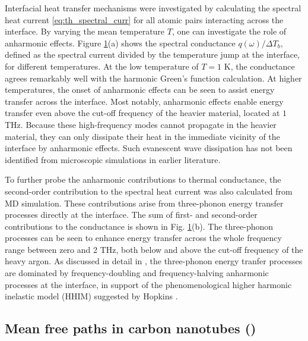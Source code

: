 \begin{figure}[tb]
\begin{center}
 \label{fig:nemd_fig2}
 \end{center}
\end{figure}

Interfacial heat transfer mechanisms were investigated by calculating the spectral heat current \eqref{eq:th_spectral_curr} for all atomic pairs interacting across the interface. By varying the mean temperature $T$, one can investigate the role of anharmonic effects. Figure \ref{fig:nemd_fig2}(a) shows the spectral conductance $q(\omega)/\Delta T_b$, defined as the spectral current divided by the temperature jump at the interface, for different temperatures. At the low temperature of $T=1$ K, the conductance agrees remarkably well with the harmonic Green's function calculation. At higher temperatures, the onset of anharmonic effects can be seen to assist energy transfer across the interface. Most notably, anharmonic effects enable energy transfer even above the cut-off frequency of the heavier material, located at $1$ THz. Because these high-frequency modes cannot propagate in the heavier material, they can only dissipate their heat in the immediate vicinity of the interface by anharmonic effects. Such evanescent wave dissipation has not been identified from microscopic simulations in earlier literature.

To further probe the anharmonic contributions to thermal conductance, the second-order contribution to the spectral heat current was also calculated from MD simulation. These contributions arise from three-phonon energy transfer processes directly at the interface. The sum of first- and second-order contributions to the conductance is shown in Fig. \ref{fig:nemd_fig2}(b). The three-phonon processes can be seen to enhance energy transfer across the whole frequency range between zero and 2 THz,  both below and above the cut-off frequency of the heavy argon. As discussed in detail in , the three-phonon energy tranfer processes are dominated by frequency-doubling and frequency-halving anharmonic processes at the interface, in support of the phenomenological higher harmonic inelastic model (HHIM) suggested by Hopkins \cite{hopkins09_jap}.

\subsection{Mean free paths in carbon nanotubes ()}

\label{sec:results_mfps}

